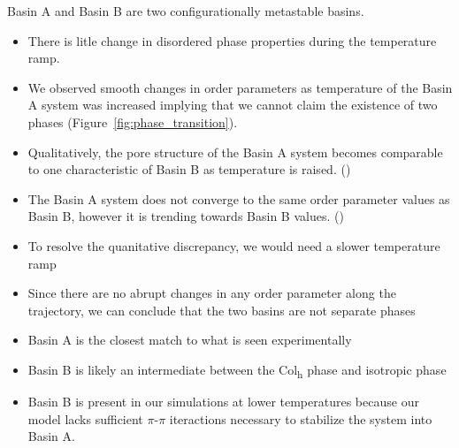 \documentclass{article}
\begin{document}
  Basin A and Basin B are two configurationally metastable basins.
  \begin{itemize}
        \item There is litle change in disordered phase properties during the 
        temperature ramp.
	\item We observed smooth changes in order parameters as temperature
        of the Basin A system was increased implying that we cannot claim the
	existence of two phases (Figure~\ref{fig:phase_transition}).
	\item Qualitatively, the pore structure of the Basin A system becomes
        comparable to one characteristic of Basin B as temperature is raised. ()
	\item The Basin A system does not converge to the same order parameter
	values as Basin B, however it is trending towards Basin B values. ()
	\item To resolve the quanitative discrepancy, we would need a slower 
	temperature ramp
	\item Since there are no abrupt changes in any order parameter along the 
	trajectory, we can conclude that the two basins are not separate phases
	\item Basin A is the closest match to what is seen experimentally
	\item Basin B is likely an intermediate between the Col\textsubscript{h} 
	phase and isotropic phase
	\item Basin B is present in our simulations at lower temperatures 
	because our model lacks sufficient $\pi$-$\pi$ iteractions necessary to 
	stabilize the system into Basin A. 
  \end{itemize} 
\end{document}
